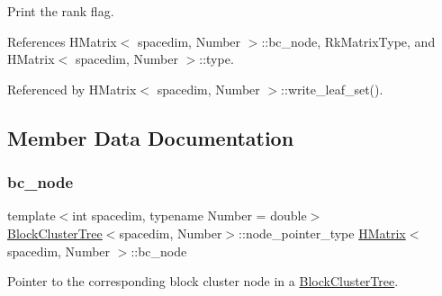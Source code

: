 Print the {\ttfamily rank} flag.

References H\+Matrix$<$ spacedim, Number $>$\+::bc\+\_\+node, Rk\+Matrix\+Type, and H\+Matrix$<$ spacedim, Number $>$\+::type.



Referenced by H\+Matrix$<$ spacedim, Number $>$\+::write\+\_\+leaf\+\_\+set().



\subsection{Member Data Documentation}
\mbox{\label{classHMatrix_a4a304494c970b5b267be1d8459d51586}} 
\subsubsection{\texorpdfstring{bc\+\_\+node}{bc\_node}}
{\footnotesize\ttfamily template$<$int spacedim, typename Number = double$>$ \\
\hyperlink{classBlockClusterTree}{Block\+Cluster\+Tree}$<$spacedim, Number$>$\+::node\+\_\+pointer\+\_\+type \hyperlink{classHMatrix}{H\+Matrix}$<$ spacedim, Number $>$\+::bc\+\_\+node\hspace{0.3cm}{\ttfamily [private]}}

Pointer to the corresponding block cluster node in a \hyperlink{classBlockClusterTree}{Block\+Cluster\+Tree}. 

